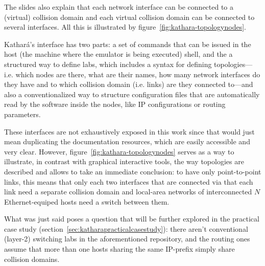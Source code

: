 The slides also explain that each network interface can be connected to a (virtual) collision domain and each virtual collision domain can be connected to several interfaces.
All this is illustrated by figure~\ref{fig:kathara-topologynodes}.

Kathará's interface has two parts: a set of commands that can be issued in the host (the machine where the emulator is being executed) shell, and the a structured way to define labs, which includes a syntax for defining topologies---i.e. which nodes are there, what are their names, how many network interfaces do they have and to which collision domain (i.e. links) are they connected to---and also a conventionalized way to structure configuration files that are automatically read by the software inside the nodes, like IP configurations or routing parameters.

These interfaces are not exhaustively exposed in this work since that would just mean duplicating the documentation resources, which are easily accessible and very clear.
However, figure~\ref{fig:kathara-topologynodes} serves as a way to illustrate, in contrast with graphical interactive tools, the way topologies are described and allows to take an immediate conclusion: to have only point-to-point links, this means that only each two interfaces that are connected via that each link need a separate collision domain and local-area networks of interconnected $N$ Ethernet-equiped hosts need a switch between them.

What was just said poses a question that will be further explored in the practical case study (section~\ref{sec:katharapracticalcasestudy}): there aren't conventional (layer-2) switching labs in the aforementioned repository, and the routing ones assume that more than one hosts sharing the same IP-prefix simply share collision domains.




